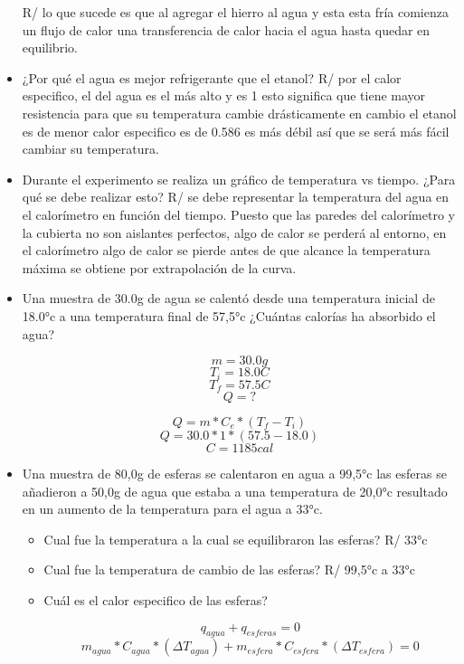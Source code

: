 \documentclass{article}
\begin{document}
\begin{multicols}{2}
\begin{itemize}
    R/ lo que sucede es que al agregar el hierro al agua y esta esta fría comienza un flujo de calor una transferencia de calor hacia el agua hasta quedar en equilibrio. 
    
    \item ¿Por qué el agua es mejor refrigerante que el etanol?
    R/ por el calor especifico, el del agua es el más alto y es 1 esto significa que tiene mayor resistencia para que su temperatura cambie drásticamente en cambio el etanol es de menor calor especifico es de 0.586 es más débil así que se será más fácil cambiar su temperatura.
    
    \item Durante el experimento se realiza un gráfico de temperatura vs tiempo. ¿Para qué se debe realizar esto?
    R/ se debe representar la temperatura del agua en el calorímetro en función del tiempo. Puesto que las paredes del calorímetro y la cubierta no son aislantes perfectos, algo de calor se perderá al entorno, en el calorímetro algo de calor se pierde antes de que alcance la temperatura máxima se obtiene por extrapolación de la curva.
    
    \item Una muestra de 30.0g de agua se calentó desde una temperatura inicial de 18.0°c a una temperatura final de 57,5°c ¿Cuántas calorías ha absorbido el agua?
    \begin{multicols}{2}
    $$ m=30.0g$$ $$ T_{i}=18.0 C $$ $$ T_{f}=57.5 C $$ $$ Q=?$$
    
    $$Q= m*C_{e}*(T_{f}-T_{i})$$ $$Q=30.0* 1 *(57.5-18.0)$$ $$C=1185 cal$$
    \end{multicols}
    
\item Una muestra de 80,0g de esferas se calentaron en agua a 99,5°c las esferas se añadieron a 50,0g de agua que estaba a una temperatura de 20,0°c resultado en un aumento de la temperatura para el agua a 33°c.

\begin{itemize}
    \item Cual fue la temperatura a la cual se equilibraron las esferas?
    R/ 33°c
    \item Cual fue la temperatura de cambio de las esferas?
    R/ 99,5°c a 33°c
    \item Cuál es el calor especifico de las esferas?
    
    
    $$q_{agua}+q_{esferas}=0$$
    \[m_{agua}*C_{agua}*(\Delta T_{agua})+ m_{esfera}*C_{esfera}*(\Delta T_{esfera})=0\]
   

\end{itemize}
\end{itemize}
\end{multicols}
\end{document}
